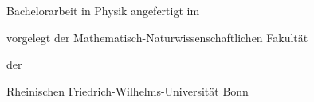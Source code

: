 \documentclass[
    paper=a4,
    fontsize=12pt,
    ngerman,
    english
]{scrreprt}
\begin{document}
\begin{titlepage}
    \thispagestyle{empty}
    \centering

    \vspace*{3.2cm}

    {\bfseries\fontsize{20}{24}\selectfont\thesistitle\par}

    \vspace{2.1cm}

    {\fontsize{16}{20}\selectfont\thesisauthor\par}

    \vspace{2.0cm}

    {\fontsize{16}{20}\selectfont Bachelorarbeit in Physik angefertigt im\par}

    \vspace{0.8cm}

    {\fontsize{16}{20}\selectfont\inInstitute\par}

    \vspace{2.0cm}

    {\fontsize{16}{20}\selectfont
    vorgelegt der Mathematisch-Naturwissenschaftlichen Fakultät\par}

    \vspace{0.6cm}

    {\fontsize{16}{20}\selectfont der\par}

    \vspace{1.0cm}

    {\fontsize{16}{20}\selectfont
    Rheinischen Friedrich-Wilhelms-Universität Bonn\par}

    \vspace{2.0cm}

    {\fontsize{16}{20}\selectfont\thesismonth\ \thesisyear\par}

    \vfill
\end{titlepage}

\clearpage
\thispagestyle{empty}
\mbox{}
\vfill
\end{document}
